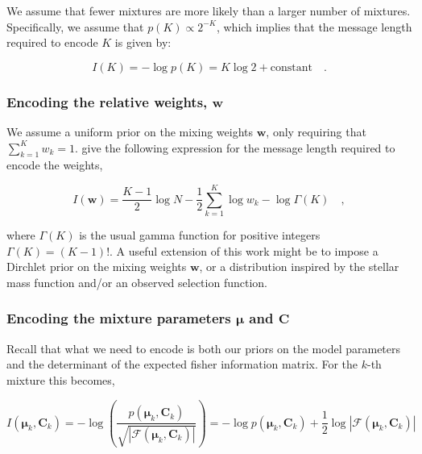 \documentclass{aastex61}
\newcommand{\vect}[1]{\boldsymbol{\mathbf{#1}}}
\def\veccov{\vect{C}}
\def\vecmean{\vect{\mu}}
\def\weight{w}
\def\weights{\vect{\weight}}
\begin{document}
We assume that fewer mixtures are more likely than a larger number of mixtures.
Specifically, we assume that $p(K) \propto 2^{-K}$, which implies that the
message length required to encode $K$ is given by:

\begin{equation}
  I(K) = -\log{p(K)} = K\log{2} + \textrm{constant} \quad .
\end{equation}


\subsubsection{Encoding the relative weights, $\weights$}
\label{sec:encoding-weights}

We assume a uniform prior on the mixing weights $\bm{w}$, only requiring that
$\sum_{k=1}^{K}w_k = 1$.
\citet{Boulton_1969} give the following expression for the message length 
required to encode the weights,

\begin{equation}
I(\weights) = \frac{K - 1}{2}\log{N} - \frac{1}{2}\sum_{k=1}^{K}\log\weight_k - \log{\Gamma{\left(K\right)}} \quad ,
\end{equation}

\noindent{}where $\Gamma(K)$ is the usual gamma function for positive integers
$\Gamma(K) = (K - 1)!$.
A useful extension of this work might be to impose a Dirchlet prior on the 
mixing weights $\weights$, or a distribution inspired by the stellar mass 
function and/or an observed selection function.



\subsubsection{Encoding the mixture parameters $\vecmean$ and $\veccov$}
\label{sec:encoding-mixture-parameters}

Recall that what we need to encode is both our priors on the model parameters
and the determinant of the expected fisher information matrix.
For the $k$-th mixture this becomes,

\begin{equation}
  I(\vecmean_k,\veccov_k) = -\log{\left(\frac{p(\vecmean_k,\veccov_k)}{\sqrt{|\mathcal{F}\left(\vecmean_k,\veccov_k\right)|}}\right)}
                          = -\log{p(\vecmean_k,\veccov_k)} + \frac{1}{2}\log{|\mathcal{F}\left(\vecmean_k,\veccov_k\right)|}
\end{equation}
\end{document}
